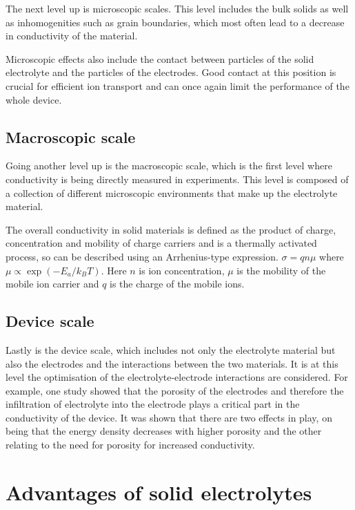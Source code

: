 \documentclass[10pt,a4paper, titlepage]{article}
\begin{document}
The next level up is microscopic scales. 
This level includes the bulk solids as well as inhomogenities such as grain boundaries, which most often lead to a decrease in conductivity of the material. 

Microscopic effects also include the contact between particles of the solid electrolyte and the particles of the electrodes. 
Good contact at this position is crucial for efficient ion transport and can once again limit the performance of the whole device. 

\subsection{Macroscopic scale}

Going another level up is the macroscopic scale, which is the first level where conductivity is being directly measured in experiments. 
This level is composed of a collection of different microscopic environments that make up the electrolyte material.

The overall conductivity in solid materials is defined as the product of charge, concentration and mobility of charge carriers and is a thermally activated process, so can be described using an Arrhenius-type expression. 
$ \sigma = q n \mu $ where $ \mu \propto \exp(-E_a/k_BT) $. 
Here $ n $ is ion concentration, $ \mu $ is the mobility of the mobile ion carrier and $ q $ is the charge of the mobile ions.  

\subsection{Device scale}

Lastly is the device scale, which includes not only the electrolyte material but also the electrodes and the interactions between the two materials. 
It is at this level the optimisation of the electrolyte-electrode interactions are considered. 
For example, one study showed that the porosity of the electrodes and therefore the infiltration of electrolyte into the electrode plays a critical part in the conductivity of the device. 
It was shown that there are two effects in play, on being that the energy density decreases with higher porosity and the other relating to the need for porosity for increased conductivity. \cite{RN7} 

\section{Advantages of solid electrolytes}
\end{document}
